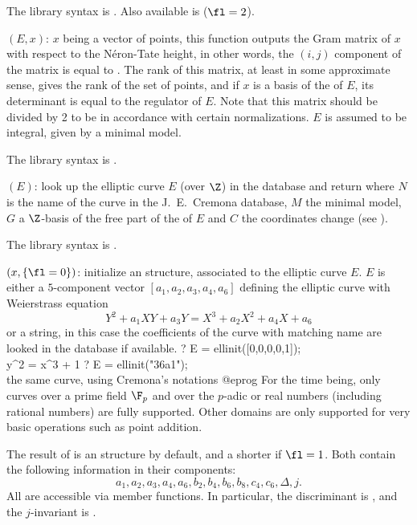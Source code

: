 The library syntax is .
Also available is 
($\fl=2$).

$(E,x)$: \label{se:ellheightmatrix}
$x$ being a vector of points, this
function outputs the Gram matrix of $x$ with respect to the N\'eron-Tate
height, in other words, the $(i,j)$ component of the matrix is equal to
. The rank of this matrix, at least in some
approximate sense, gives the rank of the set of points, and if $x$ is a
basis of the  of $E$, its determinant is equal to
the regulator of $E$. Note that this matrix should be divided by 2 to be in
accordance with certain normalizations. $E$ is assumed to be integral,
given by a minimal model.

The library syntax is .

$(E)$: \label{se:ellidentify}
look up the elliptic curve $E$ (over $\Z$)
in the  database and return \kbd{[[N, M, G], C]}  where $N$
is the name of the curve in the J.~E.~Cremona database, $M$ the minimal
model, $G$ a $\Z$-basis of the free part of the 
of $E$ and $C$ the coordinates change (see ).

The library syntax is .

$(x,\{\fl=0\})$: \label{se:ellinit}
initialize an  structure,
associated to the elliptic curve $E$. $E$ is either a $5$-component
vector $[a_1,a_2,a_3,a_4,a_6]$ defining the elliptic curve with Weierstrass
equation
$$ Y^2 + a_1 XY + a_3 Y = X^3 + a_2 X^2 + a_4 X + a_6 $$
or a string, in this case the coefficients of the curve with matching name
are looked in the  database if available.
\bprog
? E = ellinit([0,0,0,0,1]); \\ y^2 = x^3 + 1
? E = ellinit("36a1");      \\ the same curve, using Cremona's notations
@eprog\noindent
For the time being, only curves over a prime field $\F_p$ and over the
$p$-adic or real numbers (including rational numbers) are fully supported.
Other domains are only supported for very basic operations such as point
addition.

The result of  is an  structure by default, and
a shorter  if $\fl=1$. Both contain the following information in
their components:
%
$$ a_1,a_2,a_3,a_4,a_6,b_2,b_4,b_6,b_8,c_4,c_6,\Delta,j.$$
%
All are accessible via member functions. In particular, the discriminant is
, and the $j$-invariant is .

